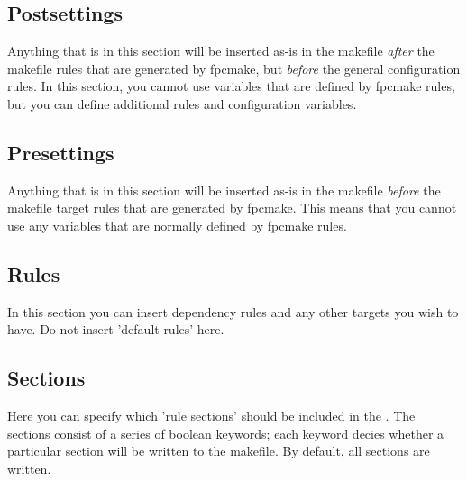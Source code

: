 \subsection{Postsettings}
Anything that is in this section will be inserted as-is in the makefile
\textit{after} the makefile rules that are generated by fpcmake, but
\textit{before} the general configuration rules.
In this section, you cannot use variables that are defined by fpcmake rules, but you
can define additional rules and configuration variables.

\subsection{Presettings}
Anything that is in this section will be inserted as-is in the makefile
\textit{before} the makefile target rules that are generated by fpcmake.
This means that you cannot use any variables that are normally defined by
fpcmake rules.

\subsection{Rules}
In this section you can insert dependency rules and any other targets
you wish to have. Do not insert 'default rules' here.

\subsection{Sections}
Here you can specify which 'rule sections' should be included in the
.
The sections consist of a series of boolean keywords; each keyword decies
whether a particular section will be written to the makefile. By default,
all sections are written.

